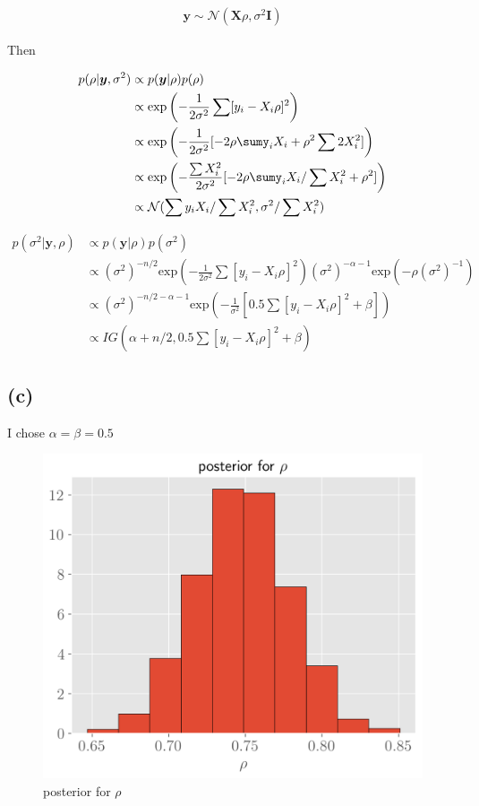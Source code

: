 \documentclass[11pt]{article}
\begin{document}
\begin{align*}
    \boldsymbol{y} \sim \mathcal{N}(\boldsymbol{X}\rho , \sigma^2\boldsymbol{I})
\end{align*}

Then

\begin{align*}
    p(\rho|\boldsymbol{y}, \sigma^2) &\propto p(\boldsymbol{y}|\rho)p(\rho)\\
    & \propto\text{exp} \left( -\frac{1}{2\sigma^2} \sum [y_i-X_i\rho]^2\right)\\
      & \propto\text{exp} \left( -\frac{1}{2\sigma^2} [-2\rho\sumy_iX_i + \rho^2\sum2X_i^2]\right)\\
      & \propto\text{exp} \left( -\frac{\sum X_i^2}{2\sigma^2} [-2\rho\sumy_iX_i/\sum X_i^2 + \rho^2]\right)\\
      & \propto \mathcal{N}(\sum y_i X_i / \sum X_i^2, \sigma^2/\sum X_i^2)
\end{align*}

\begin{align*}
    p(\sigma^2|\boldsymbol{y}, \rho) &\propto p(\boldsymbol{y}|\rho)p(\sigma^2)\\
    &  \propto (\sigma^2)^{-n/2}\text{exp} \left( -\frac{1}{2\sigma^2} \sum [y_i-X_i\rho]^2\right) (\sigma^2)^{-\alpha-1} \text{exp}(-\rho(\sigma^2)^{-1})\\
    &  \propto (\sigma^2)^{-n/2-\alpha-1}\text{exp} \left( -\frac{1}{\sigma^2} [0.5\sum [y_i-X_i\rho]^2 + \beta]\right)\\
    & \propto IG(\alpha + n/2, 0.5\sum [y_i-X_i\rho]^2 + \beta)
\end{align*}

\subsection*{(c)}
I chose $\alpha=\beta=0.5$

\begin{figure}[!h]
    \centering
    \includegraphics[scale=.6
    ]{../notebooks/rho.png}
    \caption{posterior for $\rho$}
    \label{fig:my_label}
\end{figure}
\end{document}

